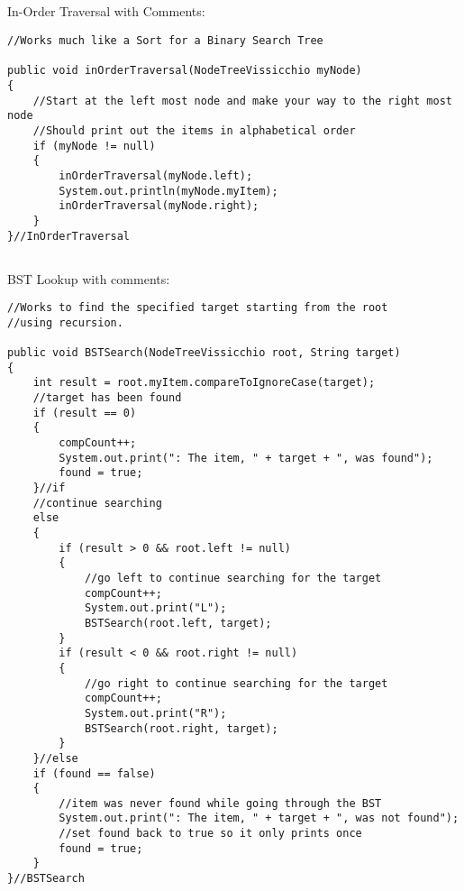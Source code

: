 \documentclass[letterpaper, 10pt]{article}
\begin{document}
\subsection{}
In-Order Traversal with Comments: \\
\begin{lstlisting}
//Works much like a Sort for a Binary Search Tree

public void inOrderTraversal(NodeTreeVissicchio myNode)
{
    //Start at the left most node and make your way to the right most node
    //Should print out the items in alphabetical order
    if (myNode != null)
    {
        inOrderTraversal(myNode.left);
        System.out.println(myNode.myItem);
        inOrderTraversal(myNode.right);
    }
}//InOrderTraversal
\end{lstlisting}

\subsection{}
BST Lookup with comments: \\
\begin{lstlisting}
//Works to find the specified target starting from the root
//using recursion.

public void BSTSearch(NodeTreeVissicchio root, String target)
{
    int result = root.myItem.compareToIgnoreCase(target);
    //target has been found
    if (result == 0)
    {
        compCount++;
        System.out.print(": The item, " + target + ", was found");
        found = true;
    }//if
    //continue searching
    else
    {
        if (result > 0 && root.left != null)
        {
            //go left to continue searching for the target
            compCount++;
            System.out.print("L");
            BSTSearch(root.left, target);
        }
        if (result < 0 && root.right != null)
        {
            //go right to continue searching for the target
            compCount++;
            System.out.print("R");
            BSTSearch(root.right, target);
        }
    }//else
    if (found == false)
    {
        //item was never found while going through the BST
        System.out.print(": The item, " + target + ", was not found");
        //set found back to true so it only prints once
        found = true;
    }
}//BSTSearch
\end{lstlisting}
\end{document}
